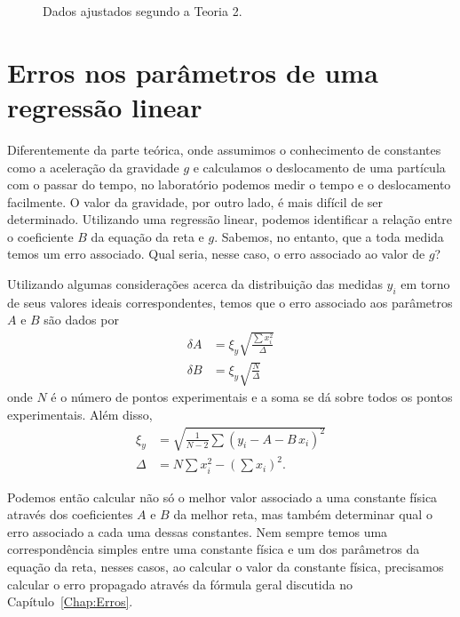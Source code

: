 \begin{figure}\forcerectofloat
\centering

\caption{Dados ajustados segundo a Teoria 2.\label{GraficoTeoria2}}
\end{figure}


\section{Erros nos parâmetros de uma regressão linear}
\label{Chap:ErrosCoefAB}

Diferentemente da parte teórica, onde assumimos o conhecimento de constantes como a aceleração da gravidade $g$ e calculamos o deslocamento de uma partícula com o passar do tempo, no laboratório podemos medir o tempo e o deslocamento facilmente. O valor da gravidade, por outro lado, é mais difícil de ser determinado. Utilizando uma regressão linear, podemos identificar a relação entre o coeficiente $B$ da equação da reta e $g$. Sabemos, no entanto, que a toda medida temos um erro associado. Qual seria, nesse caso, o erro associado ao valor de $g$? 

Utilizando algumas considerações\cite{Taylor} acerca da distribuição das medidas $y_i$ em torno de seus valores ideais correspondentes, temos que o erro associado aos parâmetros $A$ e $B$ são dados por
\begin{align}
	\delta A &= \xi_y\sqrt{\frac{\sum x_i^2}{\Delta}} \label{Eq:ErrosCoeficientesRegLinear1}\\
	\delta B &= \xi_y\sqrt{\frac{N}{\Delta}}
\end{align}
%
onde $N$ é o número de pontos experimentais e a soma se dá sobre todos os pontos experimentais. Além disso,
\begin{align}
	\xi_y &= \sqrt{\frac{1}{N-2}\sum(y_i-A-B\,x_i)^2} \\
	\Delta &= N\sum x_i^2 - \left(\sum x_i\right)^2. \label{Eq:ErrosCoeficientesRegLinear4}
\end{align}

Podemos então calcular não só o melhor valor associado a uma constante física através dos coeficientes $A$ e $B$ da melhor reta, mas também determinar qual o erro associado a cada uma dessas constantes. Nem sempre temos uma correspondência simples entre uma constante física e um dos parâmetros da equação da reta, nesses casos, ao calcular o valor da constante física, precisamos calcular o erro propagado através da fórmula geral discutida no Capítulo~\ref{Chap:Erros}.

